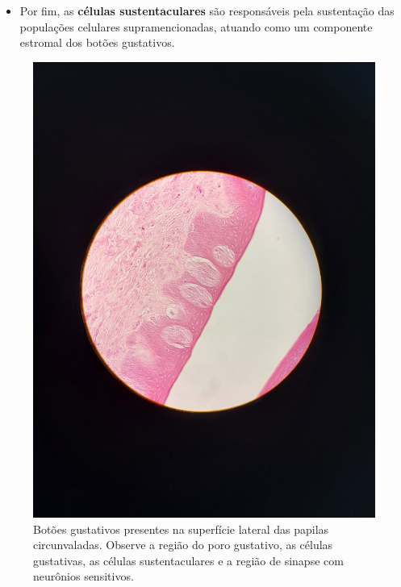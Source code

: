 \documentclass[
]{book}
\providecommand{\tightlist}{%
  \setlength{\itemsep}{0pt}\setlength{\parskip}{0pt}}
\begin{document}
\begin{itemize}
\tightlist
\item
  Por fim, as \textbf{células sustentaculares} são responsáveis pela sustentação das populações celulares supramencionadas, atuando como um componente estromal dos botões gustativos.
\end{itemize}

\begin{figure}
\centering
\includegraphics{images/neuro-gust.jpeg}
\caption{\label{fig:unnamed-chunk-14}Botões gustativos presentes na superfície lateral das papilas circunvaladas. Observe a região do poro gustativo, as células gustativas, as células sustentaculares e a região de sinapse com neurônios sensitivos.}
\end{figure}
\end{document}
